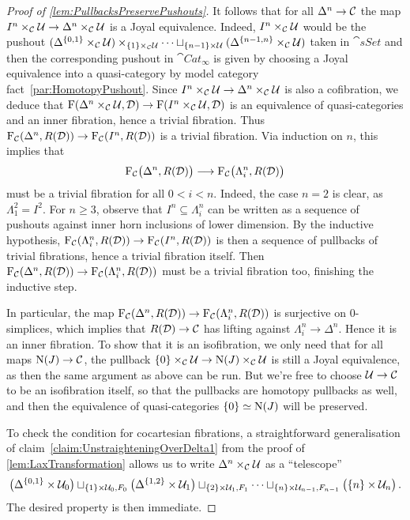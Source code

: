 \begin{proof}[Proof of \cref{lem:PullbacksPreservePushouts}]
	It follows that for all $\Delta^n\rightarrow \mathcal{C}$ the map $I^n\times_{\mathcal{C}}\mathcal{U}\rightarrow \Delta^n\times_{\mathcal{C}}\mathcal{U}$ is a Joyal equivalence. Indeed, $I^n\times_{\mathcal{C}}\mathcal{U}$ would be the pushout $(\Delta^{\{0,1\}}\times_{\mathcal{C}}\mathcal{U})\times_{\{1\}\times_{\mathcal{C}}\mathcal{U}}\dotsb\sqcup_{\{n-1\}\times\mathcal{U}}(\Delta^{\{n-1,n\}}\times_{\mathcal{C}}\mathcal{U})$ taken in $\cat{sSet}$ and then the corresponding pushout in $\cat{Cat}_\infty$ is given by choosing a Joyal equivalence into a quasi-category by model category fact~\cref{par:HomotopyPushout}. Since $I^n\times_{\mathcal{C}}\mathcal{U}\rightarrow \Delta^n\times_{\mathcal{C}}\mathcal{U}$ is also a cofibration, we deduce that $\operatorname{F}(\Delta^n\times_{\mathcal{C}}\mathcal{U},\mathcal{D})\rightarrow \operatorname{F}(I^n\times_{\mathcal{C}}\mathcal{U},\mathcal{D})$ is an equivalence of quasi-categories and an inner fibration, hence a trivial fibration. Thus $\operatorname{F}_{\mathcal{C}}(\Delta^n,R(\mathcal{D}))\rightarrow \operatorname{F}_{\mathcal{C}}(I^n,R(\mathcal{D}))$ is a trivial fibration. Via induction on $n$, this implies that 
	\begin{equation*}
		\operatorname{F}_{\mathcal{C}}\bigl(\Delta^n,R(\mathcal{D})\bigr)\longrightarrow\operatorname{F}_{\mathcal{C}}\bigl(\Lambda_i^n,R(\mathcal{D})\bigr)
	\end{equation*}
	must be a trivial fibration for all $0<i<n$. Indeed, the case $n=2$ is clear, as $\Lambda_1^2=I^2$. For $n\geqslant 3$, observe that $I^n\subseteq \Lambda_i^n$ can be written as a sequence of pushouts against inner horn inclusions of lower dimension. By the inductive hypothesis, $\operatorname{F}_{\mathcal{C}}(\Lambda_i^n,R(\mathcal{D}))\rightarrow \operatorname{F}_{\mathcal{C}}(I^n,R(\mathcal{D}))$ is then a sequence of pullbacks of trivial fibrations, hence a trivial fibration itself. Then $\operatorname{F}_{\mathcal{C}}(\Delta^n,R(\mathcal{D}))\rightarrow \operatorname{F}_{\mathcal{C}}(\Lambda_i^n,R(\mathcal{D}))$ must be a trivial fibration too, finishing the inductive step.
	
	In particular, the map $\operatorname{F}_{\mathcal{C}}(\Delta^n,R(\mathcal{D}))\rightarrow \operatorname{F}_{\mathcal{C}}(\Lambda_i^n,R(\mathcal{D}))$ is surjective on $0$-simplices, which implies that $R(\mathcal{D})\rightarrow \mathcal{C}$ has lifting against $\Lambda_i^n\rightarrow \Delta^n$. Hence it is an inner fibration. To show that it is an isofibration, we only need that for all maps $\operatorname{N}(J)\rightarrow \mathcal{C}$, the pullback $\{0\}\times_{\mathcal{C}}\mathcal{U}\rightarrow \operatorname{N}(J)\times_{\mathcal{C}}\mathcal{U}$ is still a Joyal equivalence, as then the same argument as above can be run. But we're free to choose $\mathcal{U}\rightarrow \mathcal{C}$ to be an isofibration itself, so that the pullbacks are homotopy pullbacks as well, and then the equivalence of quasi-categories $\{0\}\simeq \operatorname{N}(J)$ will be preserved.
	
	To check the condition for cocartesian fibrations, a straightforward generalisation of claim~\cref{claim:UnstraighteningOverDelta1} from the proof of \cref{lem:LaxTransformation} allows us to write $\Delta^n\times_{\mathcal{C}}\mathcal{U}$ as a \enquote{telescope} 
	\begin{equation*}
		\bigl(\Delta^{\{0,1\}}\times\mathcal{U}_0\bigr)\sqcup_{\{1\}\times\mathcal{U}_0,F_0}\bigl(\Delta^{\{1,2\}}\times \mathcal{U}_1\bigr)\sqcup_{\{2\}\times \mathcal{U}_1,F_1}\dotsb\sqcup_{\{n\}\times\mathcal{U}_{n-1},F_{n-1}}\bigl(\{n\}\times \mathcal{U}_n\bigr)\,.
	\end{equation*}
	The desired property is then immediate.%
\end{proof}

